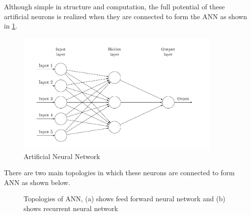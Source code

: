 Although simple in structure and computation, the full potential of these artificial neurons is realized when they are connected to form the \gls{ANN} as shown in \ref{fig:NN}.
\begin{figure}[!ht]
    \centering
    \captionsetup{justification=centering,margin=2cm}
    \includegraphics[width=10cm]{pics/neural_network.png}
    \caption{Artificial Neural Network}
    \label{fig:NN}
\end{figure}

There are two main topologies in which these neurons are connected to form \gls{ANN} as shown below. 

\begin{figure}[!ht]%
\centering
{}%
\qquad
{}%
\caption{Topologies of \gls{ANN}, (a) shows feed forward neural network and (b) shows recurrent neural network }
\label{fig:FFRN}
\end{figure}


